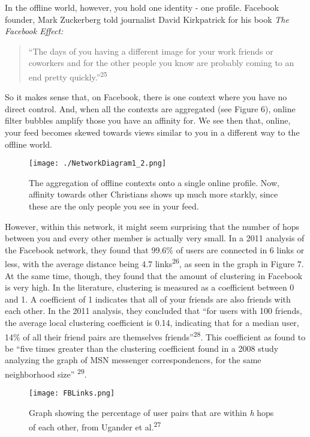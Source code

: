 \documentclass[]{article}
\begin{document}
In the offline world, however, you hold one identity - one profile.
Facebook founder, Mark Zuckerberg told journalist David Kirkpatrick for
his book \emph{The Facebook Effect:}

\begin{quote}
``The days of you having a different image for your work friends or
coworkers and for the other people you know are probably coming to an
end pretty quickly.''\textsuperscript{25}
\end{quote}

So it makes sense that, on Facebook, there is one context where you have
no direct control. And, when all the contexts are aggregated (see Figure
6), online filter bubbles amplify those you have an affinity for. We see
then that, online, your feed becomes skewed towards views similar to you
in a different way to the offline world.

\begin{figure}
\centering
\texttt{[image: ./NetworkDiagram1\_2.png]}
\caption{The aggregation of offline contexts onto a single online
profile. Now, affinity towards other Christians shows up much more
starkly, since these are the only people you see in your feed.}
\end{figure}

However, within this network, it might seem surprising that the number
of hops between you and every other member is actually very small. In a
2011 analysis of the Facebook network, they found that 99.6\% of users
are connected in 6 links or less, with the average distance being 4.7
links\textsuperscript{26}, as seen in the graph in Figure 7. At the same
time, though, they found that the amount of clustering in Facebook is
very high. In the literature, clustering is measured as a coefficient
between 0 and 1. A coefficient of 1 indicates that all of your friends
are also friends with each other. In the 2011 analysis, they concluded
that ``for users with 100 friends, the average local clustering
coefficient is 0.14, indicating that for a median user, 14\% of all
their friend pairs are themselves friends''\textsuperscript{28}. This
coefficient as found to be ``five times greater than the clustering
coefficient found in a 2008 study analyzing the graph of MSN messenger
correspondences, for the same neighborhood size'' \textsuperscript{29}.

\begin{figure}
\centering
\texttt{[image: FBLinks.png]}
\caption{Graph showing the percentage of user pairs that are within
\emph{h} hops of each other, from Ugander et al.\textsuperscript{27}}
\end{figure}
\end{document}
